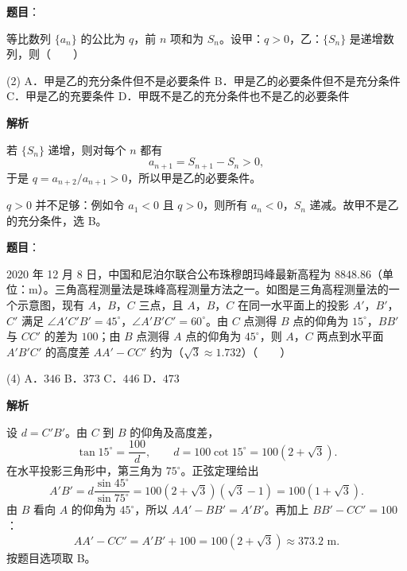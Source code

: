 \begin{answer}

\textbf{题目}：

等比数列 $\{a_n\}$ 的公比为 $q$，前 $n$ 项和为 $S_n$。设甲：$q>0$，乙：$\{S_n\}$ 是递增数列，则\mbox{（　　）}

\begin{gkopts}(2)
\task A．甲是乙的充分条件但不是必要条件
\task B．甲是乙的必要条件但不是充分条件
\task C．甲是乙的充要条件
\task D．甲既不是乙的充分条件也不是乙的必要条件
\end{gkopts}

\textbf{解析}

若 $\{S_n\}$ 递增，则对每个 $n$ 都有
\nopagebreak[4]
\[
a_{n+1}=S_{n+1}-S_n>0,
\]
于是 $q=a_{n+2}/a_{n+1}>0$，所以甲是乙的必要条件。

$q>0$ 并不足够：例如令 $a_1<0$ 且 $q>0$，则所有 $a_n<0$，$S_n$ 递减。故甲不是乙的充分条件，选 B。


\end{answer}
\begin{answer}

\textbf{题目}：

2020 年 12 月 8 日，中国和尼泊尔联合公布珠穆朗玛峰最新高程为 $8848.86$（单位：m）。三角高程测量法是珠峰高程测量方法之一。如图是三角高程测量法的一个示意图，现有 $A$，$B$，$C$ 三点，且 $A$，$B$，$C$ 在同一水平面上的投影 $A'$，$B'$，$C'$ 满足 $\angle A'C'B'=45^\circ$，$\angle A'B'C'=60^\circ$。由 $C$ 点测得 $B$ 点的仰角为 $15^\circ$，$BB'$ 与 $CC'$ 的差为 $100$；由 $B$ 点测得 $A$ 点的仰角为 $45^\circ$，则 $A$，$C$ 两点到水平面 $A'B'C'$ 的高度差 $AA'-CC'$ 约为（$\sqrt3\approx1.732$）\mbox{（　　）}
\nopagebreak[4]
\begin{center}\end{center}
\nopagebreak[4]
\begin{gkopts}(4)
\task A．$346$
\task B．$373$
\task C．$446$
\task D．$473$
\end{gkopts}

\textbf{解析}

设 $d=C'B'$。由 $C$ 到 $B$ 的仰角及高度差，
\nopagebreak[4]
\[
\tan15^\circ=\frac{100}{d},\qquad d=100\cot15^\circ=100(2+\sqrt3).
\]
在水平投影三角形中，第三角为 $75^\circ$。正弦定理给出
\nopagebreak[4]
\[
A'B'=d\frac{\sin45^\circ}{\sin75^\circ}
=100(2+\sqrt3)(\sqrt3-1)=100(1+\sqrt3).
\]
由 $B$ 看向 $A$ 的仰角为 $45^\circ$，所以 $AA'-BB'=A'B'$。再加上 $BB'-CC'=100$：
\nopagebreak[4]
\[
AA'-CC'=A'B'+100=100(2+\sqrt3)\approx373.2\text{ m}.
\]
按题目选项取 B。


\end{answer}
